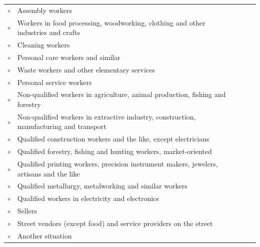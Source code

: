 \begin{center}
\begin{longtable}{r *{4}{ p{10cm} }}
        {\huge $\circ$}\hspace{1cm} & Assembly workers \\[0.2cm]
        {\huge $\circ$}\hspace{1cm} & Workers in food processing, woodworking, clothing and other industries and crafts \\[0.2cm]
        {\huge $\circ$}\hspace{1cm} & Cleaning workers \\[0.2cm]
        {\huge $\circ$}\hspace{1cm} & Personal care workers and similar \\[0.2cm]
        {\huge $\circ$}\hspace{1cm} & Waste workers and other elementary services \\[0.2cm]
        {\huge $\circ$}\hspace{1cm} & Personal service workers \\[0.2cm]
        {\huge $\circ$}\hspace{1cm} & Non-qualified workers in agriculture, animal production, fishing and forestry \\[0.2cm]
        {\huge $\circ$}\hspace{1cm} & Non-qualified workers in extractive industry, construction, manufacturing and transport \\[0.2cm]
        {\huge $\circ$}\hspace{1cm} & Qualified construction workers and the like, except electricians \\[0.2cm]
        {\huge $\circ$}\hspace{1cm} & Qualified forestry, fishing and hunting workers, market-oriented \\[0.2cm]
        {\huge $\circ$}\hspace{1cm} & Qualified printing workers, precision instrument makers, jewelers, artisans and the like \\[0.2cm]
        {\huge $\circ$}\hspace{1cm} & Qualified metallurgy, metalworking and similar workers \\[0.2cm]
        {\huge $\circ$}\hspace{1cm} & Qualified workers in electricity and electronics \\[0.2cm]
        {\huge $\circ$}\hspace{1cm} & Sellers \\[0.2cm]
        {\huge $\circ$}\hspace{1cm} & Street vendors (except food) and service providers on the street \\[0.2cm]
        {\huge $\circ$}\hspace{1cm} & Another situation
    \end{longtable}
\end{center}
\vspace{0.6cm}

